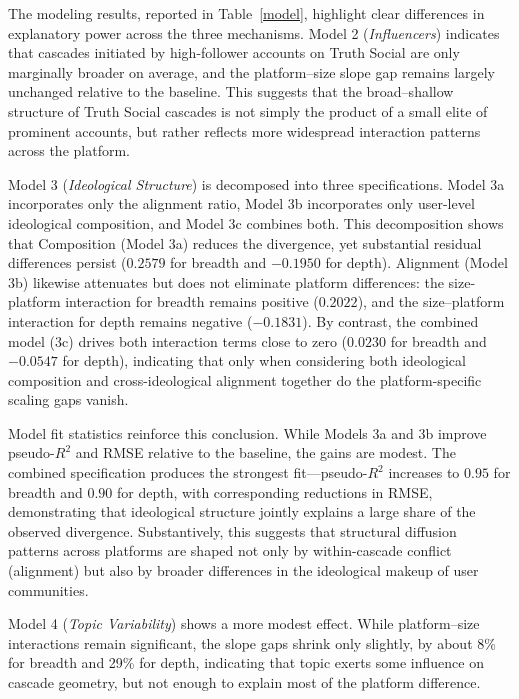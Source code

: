 \documentclass[letterpaper]{article} %
\begin{document}
The modeling results, reported in Table~\ref{model}, highlight clear differences in explanatory power across the three mechanisms. Model 2 (\textit{Influencers}) indicates that cascades initiated by high-follower accounts on Truth Social are only marginally broader on average, and the platform–size slope gap remains largely unchanged relative to the baseline. This suggests that the broad–shallow structure of Truth Social cascades is not simply the product of a small elite of prominent accounts, but rather reflects more widespread interaction patterns across the platform.

Model 3 (\textit{Ideological Structure}) is decomposed into three specifications. Model 3a incorporates only the alignment ratio, Model 3b incorporates only user-level ideological composition, and Model 3c combines both. This decomposition shows that Composition (Model 3a) reduces the divergence, yet substantial residual differences persist ($0.2579$ for breadth and $-0.1950$ for depth). Alignment (Model 3b) likewise attenuates but does not eliminate platform differences: the size-platform interaction for breadth remains positive ($0.2022$), and the size–platform interaction for depth remains negative ($-0.1831$). By contrast, the combined model (3c) drives both interaction terms close to zero ($0.0230$ for breadth and $-0.0547$ for depth), indicating that only when considering both ideological composition and cross-ideological alignment together do the platform-specific scaling gaps vanish.

Model fit statistics reinforce this conclusion. While Models 3a and 3b improve pseudo-$R^2$ and RMSE relative to the baseline, the gains are modest. The combined specification produces the strongest fit—pseudo-$R^2$ increases to $0.95$ for breadth and $0.90$ for depth, with corresponding reductions in RMSE, demonstrating that ideological structure jointly explains a large share of the observed divergence. Substantively, this suggests that structural diffusion patterns across platforms are shaped not only by within-cascade conflict (alignment) but also by broader differences in the ideological makeup of user communities. 

Model 4 (\textit{Topic Variability}) shows a more modest effect. While platform–size interactions remain significant, the slope gaps shrink only slightly, by about 8\% for breadth and 29\% for depth, indicating that topic exerts some influence on cascade geometry, but not enough to explain most of the platform difference.
\end{document}
